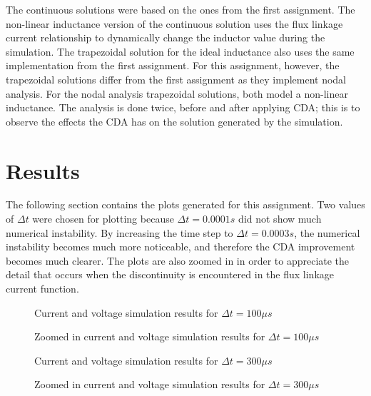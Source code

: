 \documentclass[10pt, oneside, letterpaper]{article}
\begin{document}
The continuous solutions were based on the ones from the first assignment. The non-linear inductance version of the continuous solution uses the flux linkage current relationship to dynamically change the inductor value during the simulation. The trapezoidal solution for the ideal inductance also uses the same implementation from the first assignment. For this assignment, however, the trapezoidal solutions differ from the first assignment as they implement nodal analysis. For the nodal analysis trapezoidal solutions, both model a non-linear inductance. The analysis is done twice, before and after applying CDA; this is to observe the effects the CDA has on the solution generated by the simulation.

\section{Results}

The following section contains the plots generated for this assignment. Two values of $\Delta{}t$ were chosen for plotting because $\Delta{}t = 0.0001s$ did not show much numerical instability. By increasing the time step to $\Delta{}t = 0.0003s$, the numerical instability becomes much more noticeable, and therefore the CDA improvement becomes much clearer. The plots are also zoomed in in order to appreciate the detail that occurs when the discontinuity is encountered in the flux linkage current function.

\begin{figure}[H]
  \begin{center}
    
  \end{center}
  \caption{Current and voltage simulation results for $\Delta{}t = 100\mu{}s$}
  \label{compare-plots-100us}
\end{figure}
\begin{figure}[H]
  \begin{center}
    
  \end{center}
  \caption{Zoomed in current and voltage simulation results for $\Delta{}t = 100\mu{}s$}
  \label{compare-plots-zoom-100us}
\end{figure}

\begin{figure}[H]
  \begin{center}
    
  \end{center}
  \caption{Current and voltage simulation results for $\Delta{}t = 300\mu{}s$}
  \label{compare-plots-300us}
\end{figure}
\begin{figure}[H]
  \begin{center}
    
  \end{center}
  \caption{Zoomed in current and voltage simulation results for $\Delta{}t = 300\mu{}s$}
  \label{compare-plots-zoom-300us}
\end{figure}
\end{document}
